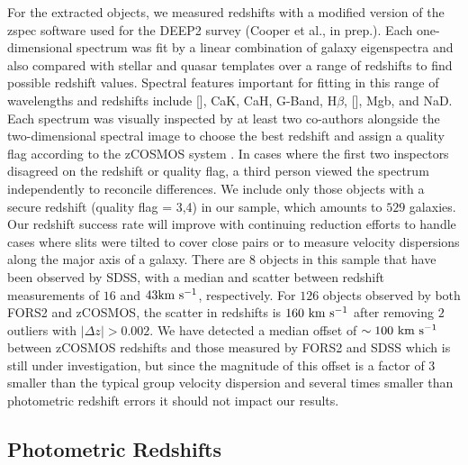 For the extracted objects, we measured redshifts with a modified
version of the {\sc zspec} software used for the DEEP2 survey (Cooper
et al., in prep.). Each one-dimensional spectrum was fit by a linear
combination of galaxy eigenspectra and also compared with stellar and
quasar templates over a range of redshifts to find possible redshift
values. Spectral features important for fitting in this range of
wavelengths and redshifts include [], CaK, CaH, G-Band,
H$\beta$, [], Mgb, and NaD. Each spectrum was visually
inspected by at least two co-authors alongside the two-dimensional spectral image to choose the
best redshift and assign a quality flag according to the zCOSMOS
system \citep{Lilly2007}. In cases where the first two inspectors
disagreed on the redshift or quality flag, a third person viewed the
spectrum independently to reconcile differences. We
include only those objects with a secure redshift (quality flag = 3,4)
in our sample, which amounts to $529$ galaxies. Our redshift success
rate will improve with continuing reduction efforts to handle cases
where slits were tilted to cover close pairs or to measure
velocity dispersions along the major axis of a galaxy. There are $8$
objects in this sample that have been observed by SDSS, with a median
and scatter between redshift measurements of $16$ and $43
\rm{km~s^{-1}}$, respectively. For $126$ objects observed by both
FORS2 and zCOSMOS, the scatter in redshifts is $160~{\rm km~s^{-1}}$
after removing $2$ outliers with $|\Delta z|>0.002$. We have detected
a median offset of $\sim100~{\rm km~s^{-1}}$ between zCOSMOS redshifts
and those measured by FORS2 and SDSS which is still under
investigation, but since the magnitude of this offset is a factor of 3
smaller than the typical group velocity dispersion and several times
smaller than photometric redshift errors it should not impact our results.


\subsection{Photometric Redshifts}
\label{cat_s:photoz}

